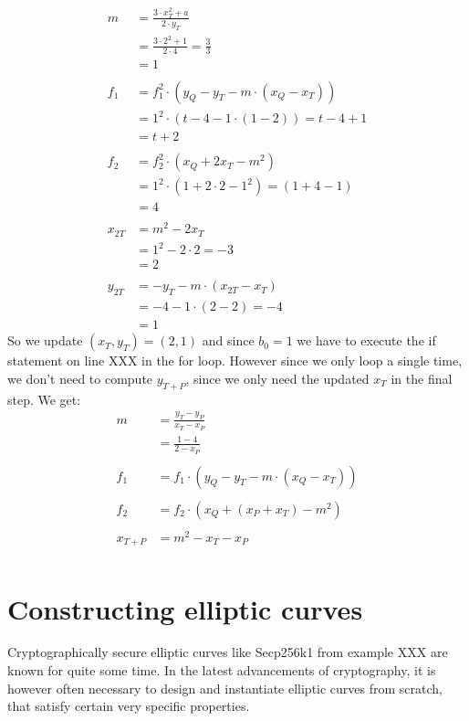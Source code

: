 \begin{example}
\begin{align*}
m & = \frac{3\cdot x_T^2 +a}{2\cdot y_T}\\
  & = \frac{3\cdot 2^2 +1}{2\cdot 4}
    = \frac{3}{3}\\
  & = 1\\
  \\
f_1 & = f_1^2\cdot (y_Q - y_T - m\cdot(x_Q-x_T)) \\
    & = 1^2\cdot (t - 4 - 1\cdot(1-2))
      = t-4+1\\
    & = t+2\\
    \\
f_2 & =  f_2^2\cdot (x_Q + 2x_T -m^2)\\
    & = 1^2\cdot (1 + 2\cdot 2 -1^2)
      = (1 + 4 -1)\\
    & = 4\\
\\  
x_{2T} & =  m^2 - 2 x_T\\
       & =  1^2 - 2\cdot 2
         = -3\\
       & = 2 \\  
\\
y_{2T} & = -y_T - m\cdot (x_{2T}-x_T)\\
       & = -4 - 1\cdot (2-2)
         = -4\\
       & = 1
\end{align*}
So we update $(x_T,y_T) =(2,1)$ and since $b_0=1$ we have to execute the if statement on line XXX in the for loop. However since we only loop a single time, we don't need to compute $y_{T+P}$, since we only need the updated $x_T$ in the final step. We get:
\begin{align*}
m & =  \frac{y_T -y_P}{x_T - x_P}\\
  & =  \frac{1 -4}{2 - x_P}\\
\\
f_1 & = f_1\cdot (y_Q -y_T -m\cdot (x_Q - x_T))\\
\\
f_2 & = f_2\cdot (x_Q + (x_P+x_T) - m^2)\\
\\
x_{T+P} & = m^2 -x_T -x_P\\
\end{align*}
\end{example}


\section{Constructing elliptic curves} Cryptographically secure elliptic curves like Secp256k1 from example XXX are known for quite some time. In the latest advancements of cryptography, it is however often necessary to design and instantiate elliptic curves from scratch, that satisfy certain very specific properties. 

